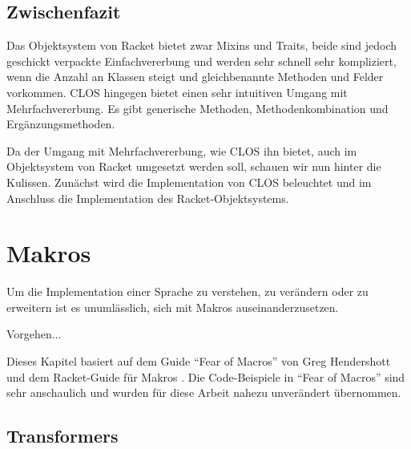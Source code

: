 
\pagestyle{diplHeadings}





\setcounter{page}{1}
\tableofcontents
\cleardoublepage 

\setcounter{page}{1} 
\mainmatter  
{}




\section{Zwischenfazit}
Das Objektsystem von Racket bietet zwar Mixins und Traits, beide sind jedoch geschickt verpackte Einfachvererbung und werden sehr schnell sehr kompliziert, wenn die Anzahl an Klassen steigt und gleichbenannte Methoden und Felder vorkommen. CLOS hingegen bietet einen sehr intuitiven Umgang mit Mehrfachvererbung. Es gibt generische Methoden, Methodenkombination und Ergänzungsmethoden.

Da der Umgang mit Mehrfachvererbung, wie CLOS ihn bietet, auch im Objektsystem von Racket umgesetzt werden soll, schauen wir nun hinter die Kulissen. Zunächst wird die Implementation von CLOS beleuchtet und im Anschluss die Implementation des Racket-Objektsystems.




\chapter{Makros} 
\label{makros}
Um die Implementation einer Sprache zu verstehen, zu verändern oder zu erweitern ist es unumlässlich, sich mit Makros auseinanderzusetzen. 

Vorgehen... %

Dieses Kapitel basiert auf dem Guide ``Fear of Macros'' von Greg Hendershott \cite{fearofmacros} und dem Racket-Guide für Makros \cite{racketguide-macros}. Die Code-Beispiele in ``Fear of Macros'' sind sehr anschaulich und wurden für diese Arbeit nahezu unverändert übernommen.


\section{Transformers}
